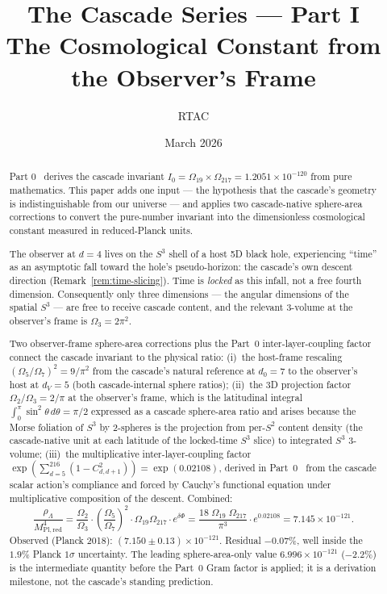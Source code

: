 \documentclass[11pt,a4paper]{article}
\title{The Cascade Series --- Part I\\[0.5em]
\large The Cosmological Constant from the Observer's Frame}
\author{RTAC}
\date{March 2026}
\begin{document}
\setlength{\emergencystretch}{3em}
\maketitle
{}
\label{paperdoc}

\begin{abstract}
Part 0~\cite{part0} derives the cascade invariant
$I_0 = \Omega_{19}\times\Omega_{217} = 1.2051\times 10^{-120}$ from pure
mathematics. This paper adds one input --- the hypothesis that the
cascade's geometry is indistinguishable from our universe --- and
applies two cascade-native sphere-area corrections to convert the
pure-number invariant into the dimensionless cosmological constant
measured in reduced-Planck units.

The observer at $d = 4$ lives on the $S^3$ shell of a host 5D black
hole, experiencing ``time'' as an asymptotic fall toward the hole's
pseudo-horizon: the cascade's own descent direction (Remark~\ref{rem:time-slicing}).
Time is \emph{locked} as this infall, not a free fourth dimension. Consequently only three dimensions --- the angular
dimensions of the spatial $S^3$ --- are free to receive cascade
content, and the relevant 3-volume at the observer's frame is
$\Omega_3 = 2\pi^2$.

Two observer-frame sphere-area corrections plus the Part~0
inter-layer-coupling factor connect the cascade invariant to the
physical ratio:
(i)~the host-frame rescaling $(\Omega_5/\Omega_7)^2 = 9/\pi^2$ from the
cascade's natural reference at $d_0 = 7$ to the observer's host at
$d_V = 5$ (both cascade-internal sphere ratios); (ii)~the 3D projection
factor $\Omega_2/\Omega_3 = 2/\pi$ at the observer's frame, which is
the latitudinal integral $\int_0^\pi\sin^2\theta\,d\theta = \pi/2$
expressed as a cascade sphere-area ratio and arises because the Morse
foliation of $S^3$ by 2-spheres is the projection from per-$S^2$
content density (the cascade-native unit at each latitude of the
locked-time $S^3$ slice) to integrated $S^3$ 3-volume; (iii)~the
multiplicative inter-layer-coupling factor
$\exp(\sum_{d=5}^{216}(1-C^2_{d,d+1}))=\exp(0.02108)$, derived in
Part~0~\cite{part0} from the cascade scalar action's compliance and
forced by Cauchy's functional equation under multiplicative composition
of the descent. Combined:
\[
\frac{\rho_\Lambda}{M^4_{\mathrm{Pl,red}}}
= \frac{\Omega_2}{\Omega_3}\cdot\left(\frac{\Omega_5}{\Omega_7}\right)^{\!2}\cdot\Omega_{19}\Omega_{217}\cdot e^{\delta\Phi}
= \frac{18\;\Omega_{19}\;\Omega_{217}}{\pi^3}\cdot e^{0.02108}
= 7.145\times 10^{-121}.
\]
Observed (Planck 2018): $(7.150\pm 0.13)\times 10^{-121}$. Residual
$-0.07\%$, well inside the $1.9\%$ Planck $1\sigma$ uncertainty. The
leading sphere-area-only value $6.996\times 10^{-121}$ ($-2.2\%$) is the
intermediate quantity before the Part~0 Gram factor is applied; it is a
derivation milestone, not the cascade's standing prediction.


\end{abstract}
\end{document}

